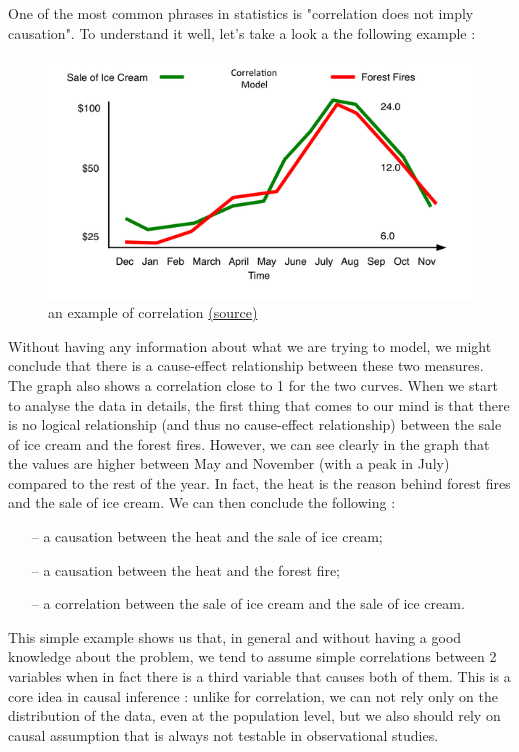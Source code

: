 \documentclass{article}
\begin{document}
One of the most common phrases in statistics is "correlation does not imply causation". To understand it well, let's take a look a the following example :

\begin{figure}[h]
\centering
\includegraphics[width=0.6 \textwidth]{../figures/corr_caus.png}
\caption{an example of correlation \href{https://www.decisionskills.com/blog/how-ice-cream-kills-understanding-cause-and-effect}{(source)}}
\end{figure}

Without having any information about what we are trying to model, we might conclude that there is a cause-effect relationship between these two measures. The graph also shows a correlation close to 1 for the two curves. When we start to analyse the data in details, the first thing that comes to our mind is that there is no logical relationship (and thus no cause-effect relationship) between the sale of ice cream and the forest fires. However, we can see clearly in the graph that the values are higher between May and November (with a peak in July) compared to the rest of the year. In fact, the heat is the reason behind forest fires and the sale of ice cream. We can then conclude the following : 

\begin{itemize}
\item[--] a causation between the heat and the sale of ice cream;
\item[--] a causation between the heat and the forest fire;
\item[--] a correlation between the sale of ice cream and the sale of ice cream.
\end{itemize}

This simple example shows us that, in general and without having a good knowledge about the problem, we tend to assume simple correlations between 2 variables when in fact there is a third variable that causes both of them. This is a core idea in causal inference : unlike for correlation, we can not rely only on the distribution of the data, even at the population level, but we also should rely on causal assumption that is always not testable in observational studies.\cite{pearl2010mathematics} 
\end{document}
